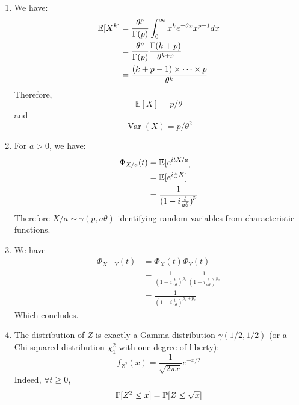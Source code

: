 
\begin{solution}
  \begin{enumerate}
    \item We have:
          \begin{align*}
            \mathbb{E}[X^k] & = \frac{\theta^p}{\Gamma(p)} \int_0^\infty x^k e^{-\theta x} x^{p-1} dx \\
                            & = \frac{\theta^p}{\Gamma(p)} \frac{\Gamma(k+p)}{\theta^{k+p}}           \\
                            & = \frac{(k+p-1) \times \cdots \times p}{\theta^k}
          \end{align*}
          Therefore,
          \[\mathbb{E}[X]=p / \theta \]
          and
          \[\operatorname{Var}(X)=p / \theta^{2}\]
    \item For $a > 0$, we have:
          \begin{align*}
            \Phi_{X/a}(t) & = \mathbb{E}[e^{itX/a}]                   \\
                          & = \mathbb{E}[e^{i\frac{t}{a}X}]           \\
                          & = \frac{1}{{(1-i \frac{t}{a\theta})}^{p}}
          \end{align*}
          Therefore $X/a \sim \gamma(p, a\theta)$ identifying random variables from characteristic functions.
    \item We have
          \begin{align*}
            \Phi_{X+Y}(t) & = \Phi_{X}(t) \Phi_{Y}(t)                                                             \\
                          & = \frac{1}{{(1-i \frac{t}{a\theta})}^{p_1}} \frac{1}{{(1-i \frac{t}{a\theta})}^{p_2}} \\
                          & = \frac{1}{{(1-i \frac{t}{a\theta})}^{p_1 + p_2}}
          \end{align*}
          Which concludes.
    \item The distribution of $Z$ is exactly a Gamma distribution $\gamma(1/2, 1/2)$ (or
          a Chi-squared distribution $\chi^2_1$ with one degree of liberty):
          \[
            f_{Z^2} (x) = \frac{1}{\sqrt{2 \pi x} }e^{-x/2}
          \]
          Indeed, $\forall t \geq 0$,
          \begin{align*}
            \proba{Z^2 \leq x} & = \proba{Z \leq \sqrt{x}}                                                 \\

\end{align*}
\end{enumerate}
\end{solution}
